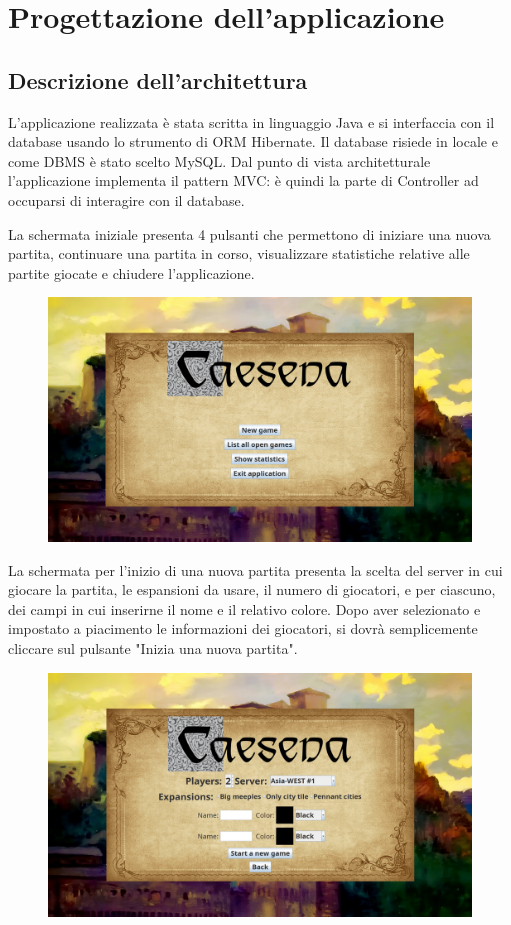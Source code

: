 \section{Progettazione dell'applicazione}
\subsection{Descrizione dell'architettura}
L'applicazione realizzata è stata scritta in linguaggio Java e si interfaccia con il database usando lo strumento di ORM Hibernate. Il database risiede in locale e come DBMS è stato scelto MySQL. Dal punto di vista architetturale l'applicazione implementa il pattern MVC: è quindi la parte di Controller ad occuparsi di interagire con il database.
\medskip

La schermata iniziale presenta 4 pulsanti che permettono di iniziare una nuova partita, continuare una partita in corso, visualizzare statistiche relative alle partite giocate e chiudere l'applicazione.

\begin{figure}[ht]
    \centering\includegraphics[scale=0.2]{images/startView.png}
\end{figure}

La schermata per l'inizio di una nuova partita presenta la scelta del server in cui giocare la partita, le espansioni da usare, il numero di giocatori, e per ciascuno, dei campi in cui inserirne il nome e il relativo colore. Dopo aver selezionato e impostato a piacimento le informazioni dei giocatori, si dovrà semplicemente cliccare sul pulsante "Inizia una nuova partita".

\begin{figure}[ht]
    \centering\includegraphics[scale=0.2]{images/newGamePage.png}
\end{figure}


